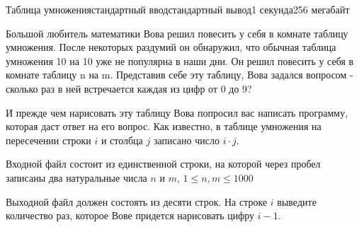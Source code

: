 \begin{problem}{Таблица умножения}{стандартный ввод}{стандартный вывод}{1 секунда}{256 мегабайт}

Большой любитель математики Вова решил повесить у себя в комнате таблицу умножения. После некоторых раздумий он обнаружил, что обычная таблица умножения 10 на 10 уже не популярна в наши дни. Он решил повесить у себя в комнате таблицу n на m. Представив себе эту таблицу, Вова задался вопросом - сколько раз в ней встречается каждая из цифр от 0 до 9?


И прежде чем нарисовать эту таблицу Вова попросил вас написать программу, которая даст ответ на его вопрос. 
Как известно, в таблице умножения на пересечении строки $i$ и столбца $j$ записано число $i \cdot j$. 

\InputFile
Входной файл состоит из единственной строки, на которой через пробел записаны два натуральные числа $n$ и $m$, $1 \le n, m \le 1000$

\OutputFile
Выходной файл должен состоять из десяти строк. На строке $i$ выведите количество раз, которое Вове придется нарисовать цифру $i - 1$.

\Example

\begin{example}
%
\end{example}

\end{problem}

